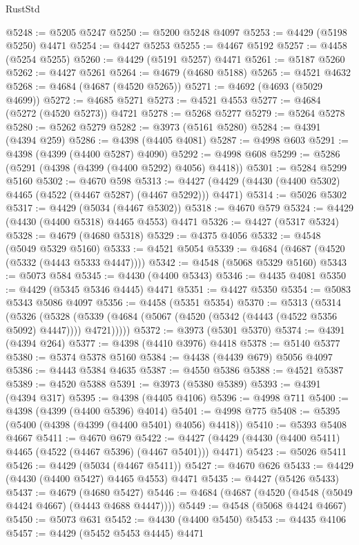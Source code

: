 \begin{lexlean}{RustStd}
\begin{coremodule}
{\begin{coremodule}
{{{{{{{{{{{{{{{{{{{{{{{{{{{{{{{{{{{{{{{{{{{{{{{{{{{{{{{{{{{{{{{{{{{{@5248 := @5205 @5247
@5250 := @5200 @5248 @4097
@5253 := @4429 (@5198 @5250) @4471
@5254 := @4427 @5253
@5255 := @4467 @5192
@5257 := @4458 (@5254 @5255)
@5260 := @4429 (@5191 @5257) @4471
@5261 := @5187 @5260
@5262 := @4427 @5261
@5264 := @4679 (@4680 @5188)
@5265 := @4521 @4632
@5268 := @4684 (@4687 (@4520 @5265))
@5271 := @4692 (@4693 (@5029 @4699))
@5272 := @4685 @5271
@5273 := @4521 @4553
@5277 := @4684 (@5272 (@4520 @5273)) @4721
@5278 := @5268 @5277
@5279 := @5264 @5278
@5280 := @5262 @5279
@5282 := @3973 (@5161 @5280)
@5284 := @4391 (@4394 @259)
@5286 := @4398 (@4405 @4081)
@5287 := @4998 @603
@5291 := @4398 (@4399 (@4400 @5287) @4090)
@5292 := @4998 @608
@5299 := @5286 (@5291 (@4398 (@4399 (@4400 @5292) @4056) @4418))
@5301 := @5284 @5299 @5160
@5302 := @4670 @598
@5313 := @4427 (@4429 (@4430 (@4400 @5302) @4465 (@4522 (@4467 @5287) (@4467 @5292))) @4471)
@5314 := @5026 @5302
@5317 := @4429 (@5034 (@4467 @5302))
@5318 := @4670 @579
@5324 := @4429 (@4430 (@4400 @5318) @4465 @4553) @4471
@5326 := @4427 (@5317 @5324)
@5328 := @4679 (@4680 @5318)
@5329 := @4375 @4056
@5332 := @4548 (@5049 @5329 @5160)
@5333 := @4521 @5054
@5339 := @4684 (@4687 (@4520 (@5332 (@4443 @5333 @4447))))
@5342 := @4548 (@5068 @5329 @5160)
@5343 := @5073 @584
@5345 := @4430 (@4400 @5343)
@5346 := @4435 @4081
@5350 := @4429 (@5345 @5346 @4445) @4471
@5351 := @4427 @5350
@5354 := @5083 @5343 @5086 @4097
@5356 := @4458 (@5351 @5354)
@5370 := @5313
    (@5314
      (@5326
        (@5328 (@5339 (@4684 (@5067 (@4520 (@5342 (@4443 (@4522 @5356 @5092) @4447)))) @4721)))))
@5372 := @3973 (@5301 @5370)
@5374 := @4391 (@4394 @264)
@5377 := @4398 (@4410 @3976) @4418
@5378 := @5140 @5377
@5380 := @5374 @5378 @5160
@5384 := @4438 (@4439 @679) @5056 @4097
@5386 := @4443 @5384 @4635
@5387 := @4550 @5386
@5388 := @4521 @5387
@5389 := @4520 @5388
@5391 := @3973 (@5380 @5389)
@5393 := @4391 (@4394 @317)
@5395 := @4398 (@4405 @4106)
@5396 := @4998 @711
@5400 := @4398 (@4399 (@4400 @5396) @4014)
@5401 := @4998 @775
@5408 := @5395 (@5400 (@4398 (@4399 (@4400 @5401) @4056) @4418))
@5410 := @5393 @5408 @4667
@5411 := @4670 @679
@5422 := @4427 (@4429 (@4430 (@4400 @5411) @4465 (@4522 (@4467 @5396) (@4467 @5401))) @4471)
@5423 := @5026 @5411
@5426 := @4429 (@5034 (@4467 @5411))
@5427 := @4670 @626
@5433 := @4429 (@4430 (@4400 @5427) @4465 @4553) @4471
@5435 := @4427 (@5426 @5433)
@5437 := @4679 (@4680 @5427)
@5446 := @4684 (@4687 (@4520 (@4548 (@5049 @4424 @4667) (@4443 @4688 @4447))))
@5449 := @4548 (@5068 @4424 @4667)
@5450 := @5073 @631
@5452 := @4430 (@4400 @5450)
@5453 := @4435 @4106
@5457 := @4429 (@5452 @5453 @4445) @4471
}}}}}}}}}}}}}}}}}}}}}}}}}}}}}}}}}}}}}}}}}}}}}}}}}}}}}}}}}}}}}}}}}}}}
\end{coremodule}}
\end{coremodule}
\end{lexlean}
